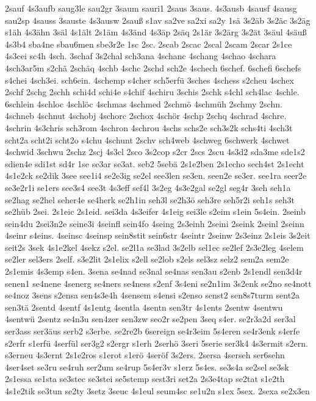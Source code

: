 {2sauf
4s3aufb
saug3le
sau2gr
3saum
sauri1
2saus
3saus.
4s3ausb
4sausf
4sausg
sau2sp
4sauss
3sauste
4s3ausw
2sauß
s1av
sa2ve
sa2xi
sa2y
1sä
3s2äb
3s2äc
3s2äg
s1äh
4s3ähn
3säl
4s1ält
2s1äm
4s3änd
4s3äp
2säq
2s1är
3s2ärg
3s2ät
3säul
4säuß
4s3b4
sba4ne
sbau6men
sbe3r2e
1sc
2sc.
2scab
2scac
2scal
2scam
2scar
2s1ce
4s3cei
sc4h
4sch.
3schaf
3s2chal
sch3ana
4schanc
4schang
4schao
4schara
4sch3ar5m
s2chä
2schäq
4schb
4schc
2schd
sch2e
4schech
6schef.
6schefi
6schefs
s4chei
4sch3ei.
sch6ein.
4schemp
s4cher
sch5erfü
3sches
4schess
s2cheu
4schex
2schf
2schg
2schh
schi4d
schi4e
s4chif
4schiru
3schis
2schk
s4chl
sch4lac
4schle.
6schlein
4schloc
4schlöc
4schmas
4schmed
2schmö
4schmüh
2schmy
2schn.
4schneb
4schnut
4schobj
4schorc
2schox
4schör
4schp
2schq
4schrad
4schre.
4schrin
4s3chris
sch3rom
4schron
4schrou
4schs
schs2e
sch3s2k
schs4ti
4sch3t
scht2a
scht2i
scht2o
s4chu
4schunt
2schv
sch4web
4schweg
6schwerk
4schwet
4schwid
3schwu
2schz
2scj
4s3cl
2sco
3s2cop
s2cr
2scs
2scu
4s3d2
sda3me
sde1s2
sdien4e
sdi1st
sd4r
1se
se3ar
se3at.
seb2
5sebä
2s1e2ben
2s1echo
sech4st
2s1echt
4s1e2ck
se2dik
3see
see1i4
se2e3ig
se2el
see3len
se3en.
seen2e
se3er.
see1ra
seer2e
se3e2r1i
se1ers
see3s4
see3t
4s3eff
sef4l
3s2eg
4s3e2gal
se2gl
seg4r
3seh
seh1a
se2hag
se2hel
seher4e
se4herk
se2h1in
seh3l
se2h3ö
seh3re
seh5r2i
seh1s
seh3t
se2hüb
2sei.
2s1eic
2s1eid.
sei3da
4s3eifer
4s1eig
sei3le
s2eim
s1ein
5s4ein.
2seinb
sein4du
2sei3n2e
seine3i
4seinfl
sein4fo
4seing
2s3einh
2seini
2seink
2seinl
2seinn
4seinr
s4eins.
4seinsc
4seinsp
sein8stit
sein6str
4seintr
2seinw
2s3einz
2s1eis
3s2eit
seit2s
3sek
4s1e2kel
4sekz
s2el.
se2l1a
se3lad
3s2elb
sel1ec
se2lef
2s3e2leg
4selem
se2ler
sel3ers
2self.
s3e2lit
2s1elix
s2ell
se2lob
s2els
sel3sz
selz2
sem2a
sem2e
2s1emis
4s3emp
s4en.
3sena
se4nad
se3nal
se4nas
sen3au
s2enb
2s1endl
sen3d4r
senen1
se4nene
4senerg
se4ners
se4ness
s2enf
3s4eni
se2n1im
3s2enk
se2no
se4nott
se4noz
3sens
s2ensa
sen4s3e4h
4sensem
s4ensi
s2enso
senst2
sen8s7turm
sent2a
sen3tä
2sentd
4sentf
4s1entg
4sentla
4sentn
sen3tr
4s1ents
2sentw
4sentwu
4sentwü
2sentz
se4n3u
sen4zer
sen3zw
seo2r
se2pen
3seq
s4er.
se2r3a2d
ser3al
ser3ass
ser3äus
serb2
s3erbe.
se2re2b
6sereign
se4r3eim
5s4eren
se4r3enk
s4erfe
s2erfr
s1erfü
4serfül
ser3g2
s2ergr
s1erh
2serhö
3seri
5serie
ser3k4
4s3ermit
s2ern.
s3erneu
4s3ernt
2s1e2ros
s1erot
s1erö
4seröf
3s2ers.
2sersa
4serseh
ser6sehn
4ser4set
se3ru
se4ruh
ser2um
se4rup
5s4er3v
s1erz
5s4es.
se3s4a
se2sel
se3sk
2s1essa
se1sta
se3stec
se3stei
se5stemp
sest3ri
set2a
2s3e4tap
se2tat
s1e2th
4s1e2tik
se3tun
se2ty
3setz
3seuc
4s1eul
seum4sc
se1u2n
s1ex
5sex.
2sexa
se2x3en
}
